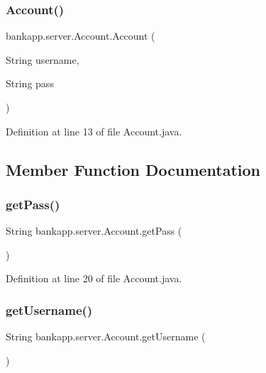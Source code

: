 \subsubsection{\texorpdfstring{Account()}{Account()}}
{\footnotesize\ttfamily bankapp.\+server.\+Account.\+Account (\begin{DoxyParamCaption}\item[{String}]{username,  }\item[{String}]{pass }\end{DoxyParamCaption})}



Definition at line 13 of file Account.\+java.



\subsection{Member Function Documentation}
\mbox{\label{classbankapp_1_1server_1_1_account_a10506c227d9d68f13bc1b177c86c6da0}} 
\subsubsection{\texorpdfstring{get\+Pass()}{getPass()}}
{\footnotesize\ttfamily String bankapp.\+server.\+Account.\+get\+Pass (\begin{DoxyParamCaption}{ }\end{DoxyParamCaption})}



Definition at line 20 of file Account.\+java.

\mbox{\label{classbankapp_1_1server_1_1_account_af1680fd62898dcc86a2e76c1f326f7d0}} 
\subsubsection{\texorpdfstring{get\+Username()}{getUsername()}}
{\footnotesize\ttfamily String bankapp.\+server.\+Account.\+get\+Username (\begin{DoxyParamCaption}{ }\end{DoxyParamCaption})}



